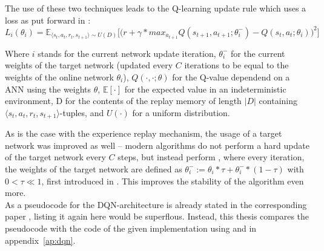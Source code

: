 The use of these two techniques leads to the Q-learning update rule which uses a loss as put forward in \cite{mnih_human-level_2015}:
\begin{equation} \label{qloss_target}
	L_i(\theta_i) = \mathds{E}_{\langle s_t,a_t,r_t,s_{t+1} \rangle \sim U(D)} \Bigg[\Big( r + \gamma * max_{a_{t+1}} Q(s_{t+1}, a_{t+1}; \theta^-_i) - Q(s_t,a_t;\theta_i) \Big)^2\Bigg]
\end{equation}
\begin{flushright}
	\scriptsize
	Where $i$ stands for the current network update iteration, $\theta_i^-$ for the current weights of the target network (updated every $C$ iterations to be equal to the weights of the online network $\theta_i$), $Q(\cdot,\cdot;\theta)$ for the Q-value dependend on a ANN using the weights $\theta$, $\mathds{E}[\cdot]$ for the expected value in an indeterministic environment, D for the contents of the replay memory of length $\lvert D \rvert$ containing $\langle s_t,a_t,r_t,s_{t+1} \rangle$-tuples, and $U(\cdot)$ for a uniform distribution.
\end{flushright}
As is the case with the experience replay mechanism, the usage of a target network was improved as well -- modern algorithms do not perform a hard update of the target network every $C$ steps, but instead perform , where every iteration, the weights of the target network are defined as $\theta^-_i := \theta_i * \tau + \theta^-_i * (1-\tau)$ with $0 < \tau \ll 1$, first introduced in \cite{lillicrap_continuous_2015}. This improves the stability of the algorithm even more.\\

As a pseudocode for the DQN-architecture is already stated in the corresponding paper \cite{mnih_human-level_2015}, listing it again here would be superflous. Instead, this thesis compares the pseudocode with the code of the given implementation using  and  in appendix~\ref{ap:dqn}. 

